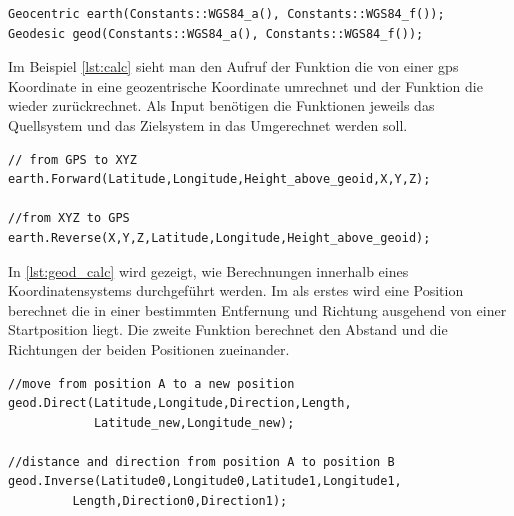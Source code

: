 \begin{lstlisting}[caption = Referenz-Ellipsoid und Geoid ,label={lst:ref}]
Geocentric earth(Constants::WGS84_a(), Constants::WGS84_f());
Geodesic geod(Constants::WGS84_a(), Constants::WGS84_f());
\end{lstlisting}
Im Beispiel \ref{lst:calc} sieht man den Aufruf der Funktion die von einer \ac{gps} Koordinate in eine geozentrische Koordinate umrechnet und der Funktion die wieder zurückrechnet.
Als Input benötigen die Funktionen jeweils das Quellsystem und das Zielsystem in das Umgerechnet werden soll. \\
\begin{lstlisting}[caption = Umrechnung der Koordinaten ,label={lst:calc}]
// from GPS to XYZ 
earth.Forward(Latitude,Longitude,Height_above_geoid,X,Y,Z);

//from XYZ to GPS
earth.Reverse(X,Y,Z,Latitude,Longitude,Height_above_geoid);
\end{lstlisting}
In \ref{lst:geod_calc} wird gezeigt, wie Berechnungen innerhalb eines Koordinatensystems durchgeführt werden. Im als erstes wird eine Position berechnet die in einer bestimmten Entfernung und Richtung ausgehend von einer Startposition liegt. Die zweite Funktion berechnet den Abstand und die Richtungen der beiden Positionen zueinander.  
\begin{lstlisting}[caption = Berechnungen innerhalb eines Systems ,label={lst:geod_calc}]
//move from position A to a new position
geod.Direct(Latitude,Longitude,Direction,Length,
            Latitude_new,Longitude_new);

//distance and direction from position A to position B
geod.Inverse(Latitude0,Longitude0,Latitude1,Longitude1,
	     Length,Direction0,Direction1);

\end{lstlisting}

